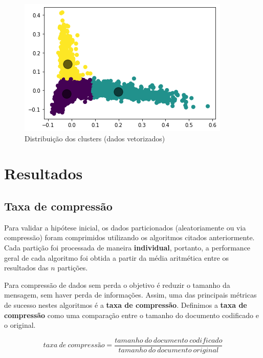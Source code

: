  \begin{figure}[H]
   \centering
   \includegraphics[scale=0.85]{figs/clustercloud.png}
    \caption{Distribuição dos clusters (dados vetorizados)}
    \label{fig:clustercloud}
 \end{figure}

\section{Resultados}
\subsection{Taxa de compressão}
Para validar a hipótese inicial, os dados particionados (aleatoriamente ou via compressão) foram comprimidos utilizando os algoritmos citados anteriormente.
Cada partição foi processada de maneira \textbf{individual}, portanto, a performance geral de cada algoritmo foi obtida a partir da média aritmética entre os resultados das $n$ partições.

Para compressão de dados sem perda o objetivo é reduzir o tamanho da mensagem, sem haver perda de informações.
Assim, uma das principais métricas de sucesso nestes algoritmos é a \textbf{taxa de compressão}.
Definimos a \textbf{taxa de compressão} como uma comparação entre o tamanho do documento codificado e o original.

\begin{equation}\label{eq:tf}
taxa~de~compressão = \frac{tamanho~do~documento~codificado}{tamanho~do~documento~original}
\end{equation}\label{eq:tf}

